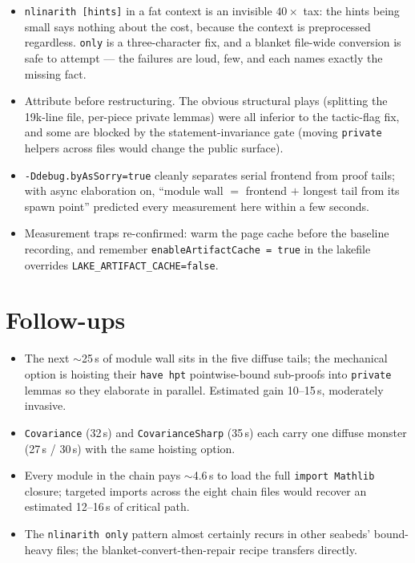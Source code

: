 \documentclass[11pt]{article}
\begin{document}
\begin{itemize}[leftmargin=2em]
\item \texttt{nlinarith [hints]} in a fat context is an invisible
$40\times$ tax: the hints being small says nothing about the cost,
because the context is preprocessed regardless. \texttt{only} is a
three-character fix, and a blanket file-wide conversion is safe to
attempt --- the failures are loud, few, and each names exactly the
missing fact.
\item Attribute before restructuring. The obvious structural plays
(splitting the 19k-line file, per-piece private lemmas) were all
inferior to the tactic-flag fix, and some are blocked by the
statement-invariance gate (moving \texttt{private} helpers across
files would change the public surface).
\item \texttt{-Ddebug.byAsSorry=true} cleanly separates serial frontend
from proof tails; with async elaboration on, ``module wall $=$ frontend
$+$ longest tail from its spawn point'' predicted every measurement
here within a few seconds.
\item Measurement traps re-confirmed: warm the page cache before the
baseline recording, and remember \texttt{enableArtifactCache = true} in
the lakefile overrides \texttt{LAKE\_ARTIFACT\_CACHE=false}.
\end{itemize}

\section{Follow-ups}

\begin{itemize}[leftmargin=2em]
\item The next $\sim$25\,s of module wall sits in the five diffuse
tails; the mechanical option is hoisting their \texttt{have hpt}
pointwise-bound sub-proofs into \texttt{private} lemmas so they
elaborate in parallel. Estimated gain 10--15\,s, moderately invasive.
\item \texttt{Covariance} (32\,s) and \texttt{CovarianceSharp} (35\,s)
each carry one diffuse monster (27\,s / 30\,s) with the same hoisting
option.
\item Every module in the chain pays $\sim$4.6\,s to load the full
\texttt{import Mathlib} closure; targeted imports across the eight
chain files would recover an estimated 12--16\,s of critical path.
\item The \texttt{nlinarith only} pattern almost certainly recurs in
other seabeds' bound-heavy files; the blanket-convert-then-repair
recipe transfers directly.
\end{itemize}
\end{document}
